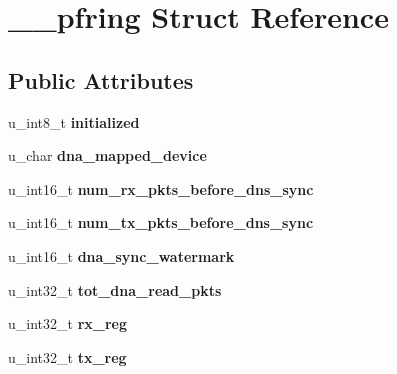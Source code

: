\hypertarget{struct____pfring}{
\section{\_\-\_\-pfring Struct Reference}
\label{struct____pfring}
}
\subsection*{Public Attributes}
\begin{DoxyCompactItemize}
\item 
\hypertarget{struct____pfring_ab917c9894ccd7b3b4e7d63b710939bb3}{
u\_\-int8\_\-t {\bfseries initialized}}
\label{struct____pfring_ab917c9894ccd7b3b4e7d63b710939bb3}

\item 
\hypertarget{struct____pfring_ad7d240403d121229c755764d73683000}{
u\_\-char {\bfseries dna\_\-mapped\_\-device}}
\label{struct____pfring_ad7d240403d121229c755764d73683000}

\item 
\hypertarget{struct____pfring_a6e8a24d935a66027779798cf071cedee}{
u\_\-int16\_\-t {\bfseries num\_\-rx\_\-pkts\_\-before\_\-dns\_\-sync}}
\label{struct____pfring_a6e8a24d935a66027779798cf071cedee}

\item 
\hypertarget{struct____pfring_a32d861898e8ad87f71cc5a46e8ba511f}{
u\_\-int16\_\-t {\bfseries num\_\-tx\_\-pkts\_\-before\_\-dns\_\-sync}}
\label{struct____pfring_a32d861898e8ad87f71cc5a46e8ba511f}

\item 
\hypertarget{struct____pfring_ac023ebdd0fc7cf6553135385a68ff6e3}{
u\_\-int16\_\-t {\bfseries dna\_\-sync\_\-watermark}}
\label{struct____pfring_ac023ebdd0fc7cf6553135385a68ff6e3}

\item 
\hypertarget{struct____pfring_a6bfbeb9951bf9a332b4ea490bf775266}{
u\_\-int32\_\-t {\bfseries tot\_\-dna\_\-read\_\-pkts}}
\label{struct____pfring_a6bfbeb9951bf9a332b4ea490bf775266}

\item 
\hypertarget{struct____pfring_a071a6b0b5ef47db6e97fbf5c1f40930f}{
u\_\-int32\_\-t {\bfseries rx\_\-reg}}
\label{struct____pfring_a071a6b0b5ef47db6e97fbf5c1f40930f}

\item 
\hypertarget{struct____pfring_a6d10e88bf867b83ed9d5be482dd69738}{
u\_\-int32\_\-t {\bfseries tx\_\-reg}}
\label{struct____pfring_a6d10e88bf867b83ed9d5be482dd69738}


\end{DoxyCompactItemize}
